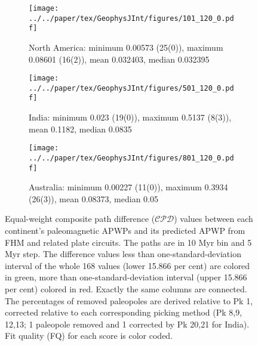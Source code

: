 \begin{figure*}
  \vspace*{-1.1cm}
	\centering
	\begin{subfigure}{.94\textwidth}
		\texttt{[image: ../../paper/tex/GeophysJInt/figures/101\_120\_0.pdf]}
		\caption{North America: minimum 0.00573 (25(0)), maximum
		0.08601 (16(2)), mean 0.032403, median 0.032395}\label{fig-na-dif} %
	\end{subfigure}
	\vspace{.1em} %
	\begin{subfigure}{.94\textwidth}
		\texttt{[image: ../../paper/tex/GeophysJInt/figures/501\_120\_0.pdf]}
		\caption{India: minimum 0.023 (19(0)), maximum 0.5137 (8(3)),
		mean 0.1182, median 0.0835}\label{fig-in-dif} %
	\end{subfigure}
	\vspace{.1em}
	\begin{subfigure}{.94\textwidth}
		\texttt{[image: ../../paper/tex/GeophysJInt/figures/801\_120\_0.pdf]}
		\caption{Australia: minimum 0.00227 (11(0)), maximum
		0.3934 (26(3)), mean 0.08373, median 0.05}\label{fig-au-dif} %
	\end{subfigure}
	\caption[Differences of each plate's paleomagnetic APWPs versus its FHM
predicted APWP]{Equal-weight composite path difference ($\mathcal{CPD}$) values
between each continent's paleomagnetic APWPs and its predicted APWP from FHM and
related plate circuits. The paths are in 10 Myr bin and 5 Myr step. The
difference values less than one-standard-deviation interval of the whole 168
values (lower 15.866 per cent) are colored in green, more than
one-standard-deviation interval (upper 15.866 per cent) colored in red. Exactly
the same columns are connected. The percentages of removed paleopoles are
derived relative to Pk 1, corrected relative to each corresponding picking
method (Pk 8,9, 12,13; 1 paleopole removed and 1 corrected by Pk 20,21 for India). Fit
quality (FQ) for each score is color coded.}\label{fig-dif} %
\end{figure*}


